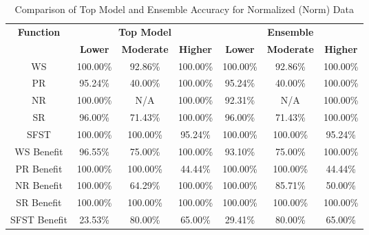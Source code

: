 \begin{table}[H]
\centering
\begin{tabular}{|c|c|c|c|c|c|c|}
\hline
\multirow{2}{*}{\textbf{Function}} & \multicolumn{3}{c|}{\textbf{Top Model}} & \multicolumn{3}{c|}{\textbf{Ensemble}} \\
\cline{2-7}
 & \textbf{Lower} & \textbf{Moderate} & \textbf{Higher} & \textbf{Lower} & \textbf{Moderate} & \textbf{Higher} \\
\hline
WS & 100.00\% & 92.86\% & 100.00\% & 100.00\% & 92.86\% & 100.00\% \\
\hline
PR & 95.24\% & 40.00\% & 100.00\% & 95.24\% & 40.00\% & 100.00\% \\
\hline
NR & 100.00\% & N/A & 100.00\% & 92.31\% & N/A & 100.00\% \\
\hline
SR & 96.00\% & 71.43\% & 100.00\% & 96.00\% & 71.43\% & 100.00\% \\
\hline
SFST & 100.00\% & 100.00\% & 95.24\% & 100.00\% & 100.00\% & 95.24\% \\
\hline
WS Benefit & 96.55\% & 75.00\% & 100.00\% & 93.10\% & 75.00\% & 100.00\% \\
\hline
PR Benefit & 100.00\% & 100.00\% & 44.44\% & 100.00\% & 100.00\% & 44.44\% \\
\hline
NR Benefit & 100.00\% & 64.29\% & 100.00\% & 100.00\% & 85.71\% & 50.00\% \\
\hline
SR Benefit & 100.00\% & 100.00\% & 100.00\% & 100.00\% & 100.00\% & 100.00\% \\
\hline
SFST Benefit & 23.53\% & 80.00\% & 65.00\% & 29.41\% & 80.00\% & 65.00\% \\
\hline
\end{tabular}
\caption{Comparison of Top Model and Ensemble Accuracy for Normalized (Norm) Data}
\label{reg_spec_tab:featred_norm_accuracy}
\end{table}
